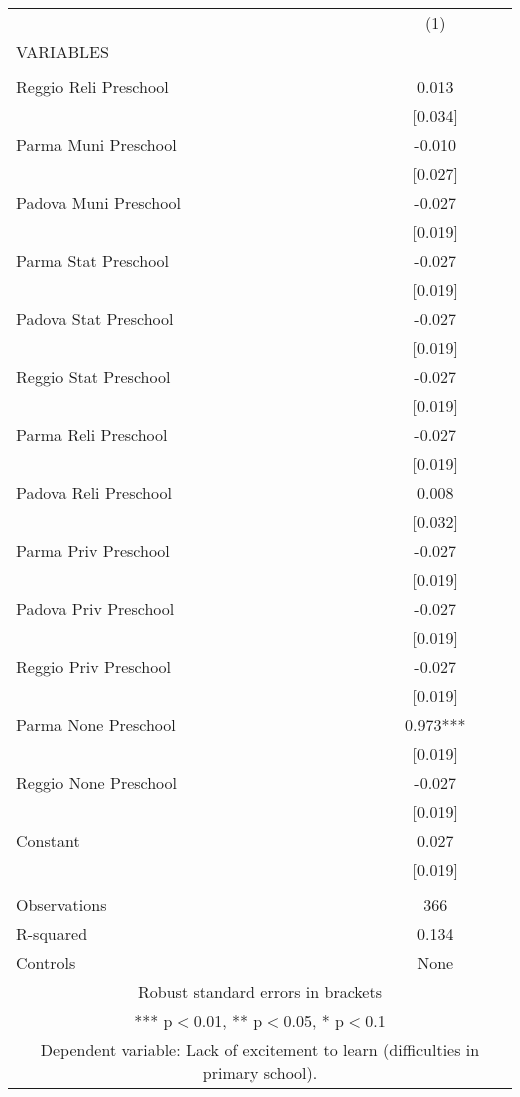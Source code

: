 \begin{tabular}{lc} \hline
 & (1) \\
VARIABLES &  \\ \hline
 &  \\
Reggio Reli Preschool & 0.013 \\
 & [0.034] \\
Parma Muni Preschool & -0.010 \\
 & [0.027] \\
Padova Muni Preschool & -0.027 \\
 & [0.019] \\
Parma Stat Preschool & -0.027 \\
 & [0.019] \\
Padova Stat Preschool & -0.027 \\
 & [0.019] \\
Reggio Stat Preschool & -0.027 \\
 & [0.019] \\
Parma Reli Preschool & -0.027 \\
 & [0.019] \\
Padova Reli Preschool & 0.008 \\
 & [0.032] \\
Parma Priv Preschool & -0.027 \\
 & [0.019] \\
Padova Priv Preschool & -0.027 \\
 & [0.019] \\
Reggio Priv Preschool & -0.027 \\
 & [0.019] \\
Parma None Preschool & 0.973*** \\
 & [0.019] \\
Reggio None Preschool & -0.027 \\
 & [0.019] \\
Constant & 0.027 \\
 & [0.019] \\
 &  \\
Observations & 366 \\
R-squared & 0.134 \\
 Controls & None \\ \hline
\multicolumn{2}{c}{ Robust standard errors in brackets} \\
\multicolumn{2}{c}{ *** p$<$0.01, ** p$<$0.05, * p$<$0.1} \\
\multicolumn{2}{c}{ Dependent variable: Lack of excitement to learn (difficulties in primary school).} \\
\end{tabular}
